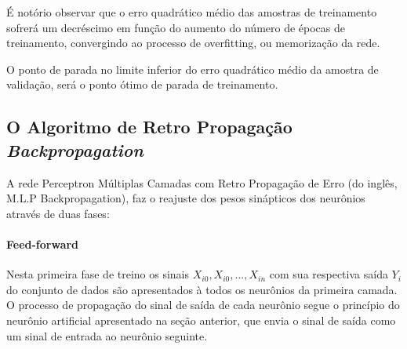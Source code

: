             	É notório observar que o erro quadrático médio das amostras de treinamento sofrerá um decréscimo em função do aumento do número de épocas de treinamento, convergindo ao processo de overfitting, ou memorização da rede.
            	
            	O ponto de parada no limite inferior do erro quadrático médio da amostra de validação, será o ponto ótimo de parada de treinamento.
          	
          	\begin{figure}[H]
          	\end{figure}

\subsection{O Algoritmo de Retro Propagação \textit{Backpropagation}}

        A rede Perceptron Múltiplas Camadas com Retro Propagação de Erro (do inglês, M.L.P Backpropagation), faz o reajuste dos pesos sinápticos dos neurônios através de duas fases:
  	       \paragraph*{Feed-forward} Nesta primeira fase de treino os sinais $X_{i0},X_{i0},...,X_{in}$ com sua respectiva saída $Y_i$ do conjunto de dados são apresentados à todos os neurônios da primeira camada. O processo de propagação do sinal de saída de cada neurônio segue o princípio do neurônio artificial apresentado na seção anterior, que envia o sinal de saída como um sinal de entrada ao neurônio seguinte.
  	       
